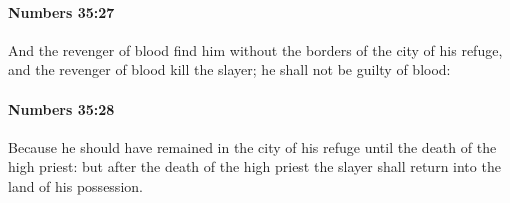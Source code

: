 		\paragraph{Numbers 35:27} %
			\label{NUMBERS-35-27}

			And the revenger of blood find him without the borders of the city of his refuge, and the revenger of blood kill the slayer; he shall not be guilty of blood:


		\paragraph{Numbers 35:28} %
			\label{NUMBERS-35-28}

			Because he should have remained in the city of his refuge until the death of the high priest: but after the death of the high priest the slayer shall return into the land of his possession.


